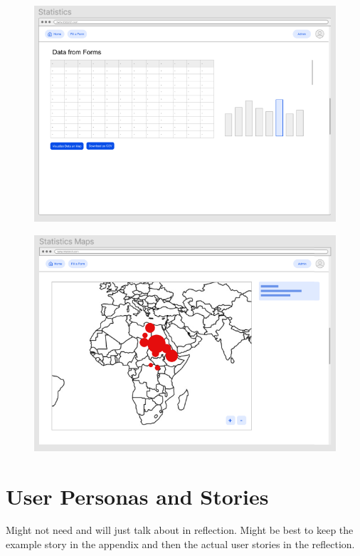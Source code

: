 \documentclass{l3proj}
\begin{document}
\begin{figure}[H]
\centering
\begin{minipage}{.5\textwidth}
  \centering
  \includegraphics[width=0.8\linewidth]{images/StatsV1.png}
  \label{fig:StatsV1}
\end{minipage}%
\begin{minipage}{.5\textwidth}
  \centering
  \includegraphics[width=0.8\linewidth]{images/MapV1.png}
  \label{fig:MapV1}
\end{minipage}
\end{figure}



\newpage

\section{User Personas and Stories}
\label{appendix:UPandS}
Might not need and will just talk about in reflection. Might be best to keep the example story in the appendix and then the actual user stories in the reflection.
\end{document}
